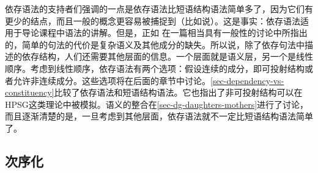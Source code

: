 依存语法的支持者们强调的一点是依存语法比短语结构语法简单多了，因为它们有更少的结点，而且一般的概念更容易被捕捉到（比如说\citealp[\S~3.2, \S~7]{Osborne2014a-u}）。这是事实：依存语法适用于导论课程中语法的讲解。但是，正如 \citet[]{SR2012a}在一篇相当具有一般性的讨论中所指出的，简单的句法的代价是复杂语义及其他成分的缺失。所以说，除了依存句法中描述的依存结构，人们还需要其他层面的信息。一个层面就是语义层，另一个是线性顺序。考虑到线性顺序，依存语法有两个选项：假设连续的成分，即可投射结构或者允许非连续成分。这些选项将在后面的章节中讨论。\ref{sec-dependency-vs-constituency}比较了依存语法和短语结构语法。它也指出了非可投射结构可以在HPSG这类理论中被模拟。语义的整合在\ref{sec-dg-daughters-mothers}进行了讨论，而且逐渐清楚的是，一旦考虑到其他层面，依存语法就不一定比短语结构语法简单了。

\subsection{次序化}
\label{sec-linearization-problems-dg}
\label{sec-dg-multiple-frontings}

